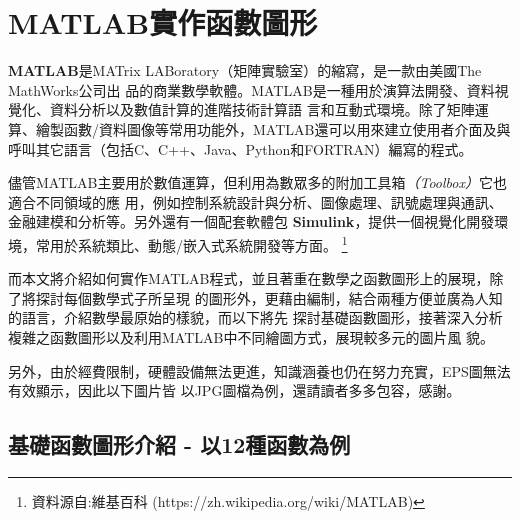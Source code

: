 %
%
\chapter{\MJH MATLAB實作函數圖形}	
	\textbf{MATLAB}是MATrix LABoratory（矩陣實驗室）的縮寫，是一款由美國The MathWorks公司出		品的商業數學軟體。MATLAB是一種用於演算法開發、資料視覺化、資料分析以及數值計算的進階技術計算語		言和互動式環境。除了矩陣運算、繪製函數/資料圖像等常用功能外，MATLAB還可以用來建立使用者介面及與		呼叫其它語言（包括C、C++、Java、Python和FORTRAN）編寫的程式。

	儘管MATLAB主要用於數值運算，但利用為數眾多的附加工具箱\emph{（Toolbox）}它也適合不同領域的應		用，例如控制系統設計與分析、圖像處理、訊號處理與通訊、金融建模和分析等。另外還有一個配套軟體包		\textbf{Simulink}，提供一個視覺化開發環境，常用於系統類比、動態/嵌入式系統開發等方面。			\footnote{資料源自:維基百科 (https://zh.wikipedia.org/wiki/MATLAB)}
	
	而本文將介紹如何實作MATLAB程式，並且著重在數學之函數圖形上的展現，除了將探討每個數學式子所呈現		的圖形外，更藉由\XeLaTeX 編制，結合兩種方便並廣為人知的語言，介紹數學最原始的樣貌，而以下將先		探討基礎函數圖形，接著深入分析複雜之函數圖形以及利用MATLAB中不同繪圖方式，展現較多元的圖片風			貌。
	
	另外，由於經費限制，硬體設備無法更進，知識涵養也仍在努力充實，EPS圖無法有效顯示，因此以下圖片皆		以JPG圖檔為例，還請讀者多多包容，感謝。
	
	\section{基礎函數圖形介紹 - 以12種函數為例}
